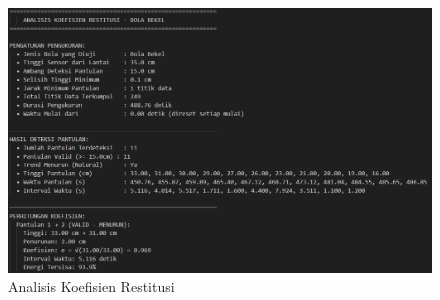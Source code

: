 \begin{figure}[!htbp]
    \centering
    \includegraphics[width=0.9\linewidth]{images/Analisis-Koefisien-Restitusi.png}
    \caption{Analisis Koefisien Restitusi}
    \label{fig:pembahasan-6}
\end{figure}

